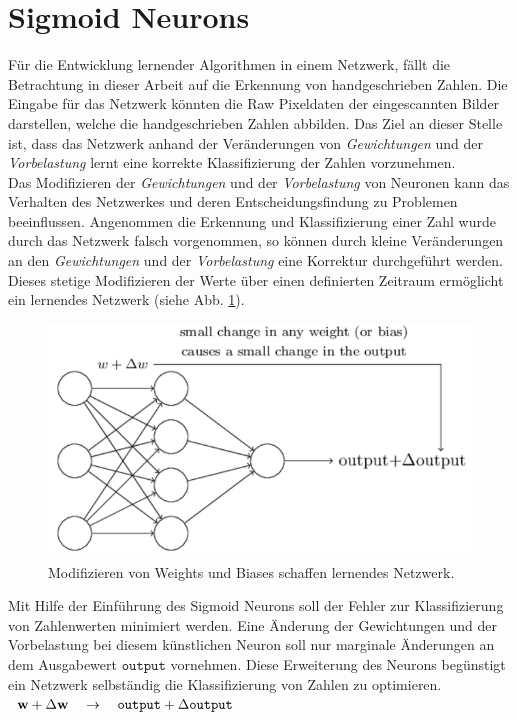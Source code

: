 \section{Sigmoid Neurons}
Für die Entwicklung lernender Algorithmen in einem Netzwerk, fällt die Betrachtung in dieser Arbeit auf die Erkennung von handgeschrieben Zahlen. Die Eingabe für das Netzwerk könnten die Raw Pixeldaten der eingescannten Bilder darstellen, welche die handgeschrieben Zahlen abbilden. Das Ziel an dieser Stelle ist, dass das Netzwerk anhand der Veränderungen von \textit{Gewichtungen} und der \textit{Vorbelastung} lernt eine korrekte Klassifizierung der Zahlen vorzunehmen. \\
Das Modifizieren der \textit{Gewichtungen} und der \textit{Vorbelastung} von Neuronen kann das Verhalten des Netzwerkes und deren Entscheidungsfindung zu Problemen beeinflussen. Angenommen die Erkennung und Klassifizierung einer Zahl wurde durch das Netzwerk falsch vorgenommen, so können durch kleine Veränderungen an den \textit{Gewichtungen} und der \textit{Vorbelastung} eine Korrektur durchgeführt werden. Dieses stetige Modifizieren der Werte über einen definierten Zeitraum ermöglicht ein lernendes Netzwerk (siehe Abb. \ref{fig:sigmoid_learning}). 
\begin{figure}[hbt]
	\centering
	\includegraphics[scale=0.7]{Bilder/sigmoid_learning}
	\caption{Modifizieren von Weights und Biases schaffen lernendes Netzwerk.} 
	\label{fig:sigmoid_learning} 
\end{figure}

\noindent
Mit Hilfe der Einführung des Sigmoid Neurons soll der Fehler zur Klassifizierung von Zahlenwerten minimiert werden. Eine Änderung der Gewichtungen und der Vorbelastung bei diesem künstlichen Neuron soll nur marginale Änderungen an dem Ausgabewert $\mathtt{output}$ vornehmen. Diese Erweiterung des Neurons begünstigt ein Netzwerk selbständig die Klassifizierung von Zahlen zu optimieren. \\[0.2cm]
\hspace*{1.3cm}
$
\begin{array}[t]{lclll}
	\mathbf{w} + \Delta\mathbf{w} \quad\rightarrow\quad \mathtt{output} + \Delta\mathtt{output}
\end{array}
$
\\[0.2cm]

